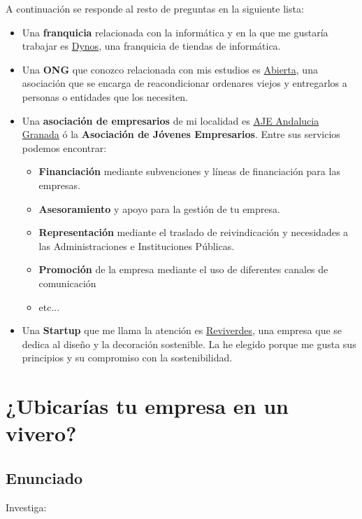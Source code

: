 A continuación se responde al resto de preguntas en la siguiente lista:

\begin{itemize}
    \item Una \textbf{franquicia} relacionada con la informática y en la que me gustaría trabajar es \href{https://www.dynos.es/}{Dynos}, una franquicia de tiendas de informática.

    \item Una \textbf{ONG} que conozco relacionada con mis estudios es \href{https://abierta.org/}{Abierta}, una asociación que se encarga de reacondicionar ordenares viejos y entregarlos a personas o entidades que los necesiten.

    \item Una \textbf{asociación de empresarios} de mi localidad es \href{https://www.ajeandalucia.org/granada/}{AJE Andalucia Granada} ó la \textbf{Asociación de Jóvenes Empresarios}. Entre sus servicios podemos encontrar:
    \begin{itemize}
        \item \textbf{Financiación} mediante subvenciones y líneas de financiación para las empresas.
        \item \textbf{Asesoramiento} y apoyo para la gestión de tu empresa.
        \item \textbf{Representación} mediante el traslado de reivindicación y necesidades a las Administraciones e Instituciones Públicas.
        \item \textbf{Promoción} de la empresa mediante el uso de diferentes canales de comunicación
        \item etc...
    \end{itemize}

    \item Una \textbf{Startup} que me llama la atención es \href{https://www.reviverdes.com/}{Reviverdes}, una empresa que se dedica al diseño y la decoración sostenible. La he elegido porque me gusta sus principios y su compromiso con la sostenibilidad.
\end{itemize}

\section{¿Ubicarías tu empresa en un vivero?}

\subsection{Enunciado}
Investiga:

